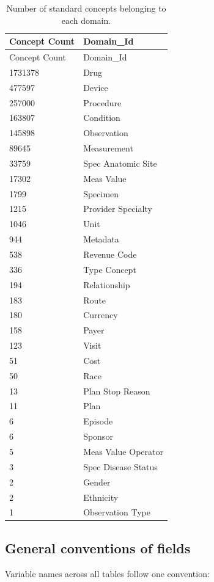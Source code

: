 \documentclass[11pt]{book}
\theoremstyle{definition}
\theoremstyle{definition}
\theoremstyle{definition}
\theoremstyle{remark}
\begin{document}
\begin{longtable}[]{@{}ll@{}}
\caption{\label{tab:domains} Number of standard concepts belonging to each domain.}\tabularnewline
\toprule
Concept Count & Domain\_Id\tabularnewline
\midrule
\endfirsthead
\toprule
Concept Count & Domain\_Id\tabularnewline
\midrule
\endhead
1731378 & Drug\tabularnewline
477597 & Device\tabularnewline
257000 & Procedure\tabularnewline
163807 & Condition\tabularnewline
145898 & Observation\tabularnewline
89645 & Measurement\tabularnewline
33759 & Spec Anatomic Site\tabularnewline
17302 & Meas Value\tabularnewline
1799 & Specimen\tabularnewline
1215 & Provider Specialty\tabularnewline
1046 & Unit\tabularnewline
944 & Metadata\tabularnewline
538 & Revenue Code\tabularnewline
336 & Type Concept\tabularnewline
194 & Relationship\tabularnewline
183 & Route\tabularnewline
180 & Currency\tabularnewline
158 & Payer\tabularnewline
123 & Visit\tabularnewline
51 & Cost\tabularnewline
50 & Race\tabularnewline
13 & Plan Stop Reason\tabularnewline
11 & Plan\tabularnewline
6 & Episode\tabularnewline
6 & Sponsor\tabularnewline
5 & Meas Value Operator\tabularnewline
3 & Spec Disease Status\tabularnewline
2 & Gender\tabularnewline
2 & Ethnicity\tabularnewline
1 & Observation Type\tabularnewline
\bottomrule
\end{longtable}

\hypertarget{general-conventions-of-fields}{%
\subsection{General conventions of fields}\label{general-conventions-of-fields}}

Variable names across all tables follow one convention:
\end{document}
